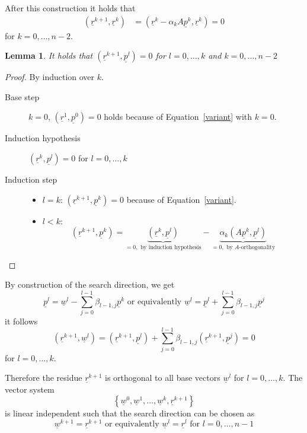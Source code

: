 \documentclass{article}
\newtheorem*{lemma}{Lemma}
\newcommand{\set}[1]{\left\{#1\right\}}
\begin{document}
After this construction it holds that
\begin{align}
  (\underline{r}^{k+1}, \underline{r}^k) &= (\underline{r}^k - \alpha_k A \underline{p}^k, \underline{r}^k) = 0
  \label{variant}
\end{align}
for $k=0,\ldots,n-2$.

\begin{lemma}
  It holds that $(\underline{r}^{k+1}, \underline{p}^l) = 0$ for $l=0,\ldots,k$ and $k=0,\ldots,n-2$
\end{lemma}
\begin{proof}
  By induction over $k$.

  \begin{description}
    \item[Base step] $k = 0$, $(\underline{r}^1, \underline{p}^0) = 0$ holds because of Equation~\ref{variant} with $k=0$.
    \item[Induction hypothesis]
      $(\underline{r}^k, \underline{p}^l) = 0$ for $l=0,\ldots,k$
    \item[Induction step]
      \begin{itemize}
        \item $l=k$: $(\underline{r}^{k+1}, \underline{p}^k) = 0$ because of Equation~\ref{variant}.
        \item $l<k$:
          \[ (\underline{r}^{k+1}, \underline{p}^k) = \underbrace{(\underline{r}^k, \underline{p}^l)}_{=0, \text{ by induction hypothesis}} - \underbrace{\alpha_k (A \underline{p}^k, \underline{p}^l)}_{=0, \text{ by $A$-orthogonality}} \]
      \end{itemize}
  \end{description}
\end{proof}

By construction of the search direction, we get
\[ \underline{p}^l = \underline{w}^l - \sum_{j=0}^{l-1} \beta_{l-1,j} \underline{p}^k \text{ or equivalently } \underline{w}^l = \underline{p}^l + \sum_{j=0}^{l-1} \beta_{l-1,j} \underline{p}^j \]
it follows
\[ (\underline{r}^{k+1}, \underline{w}^l) = (\underline{r}^{k+1}, \underline{p}^l) + \sum_{j=0}^{l-1} \beta_{l-1,j} (\underline{r}^{k+1}, \underline{p}^j) = 0 \]
for $l=0,\ldots,k$.

Therefore the residue $\underline{r}^{k+1}$ is orthogonal to all base vectors $\underline{w}^l$ for $l=0,\ldots,k$.
The vector system
\[ \set{\underline{w}^0, \underline{w}^1, \ldots, \underline{w}^k, \underline{r}^{k+1}} \]
is linear independent such that the search direction can be chosen as
\[ \underline{w}^{k+1} = \underline{r}^{k+1} \text{ or equivalently } \underline{w}^l = \underline{r}^l \text{ for } l=0,\ldots,n-1 \]
\end{document}
